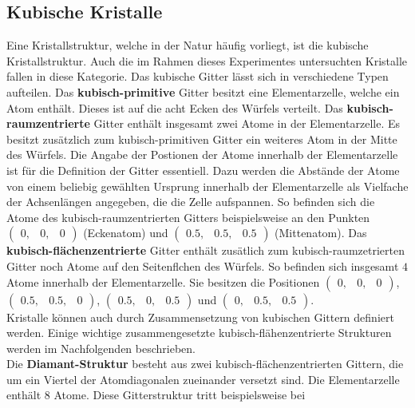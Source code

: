 \subsection{Kubische Kristalle}
%
Eine Kristallstruktur, welche in der Natur häufig vorliegt, ist die kubische Kristallstruktur. Auch die im
Rahmen dieses Experimentes untersuchten Kristalle fallen in diese Kategorie. Das kubische Gitter lässt sich
in verschiedene Typen aufteilen. Das \textbf{kubisch-primitive} Gitter besitzt eine Elementarzelle, welche
ein Atom enthält. Dieses ist auf die acht Ecken des Würfels verteilt. Das \textbf{kubisch-raumzentrierte}
Gitter enthält insgesamt zwei Atome in der Elementarzelle. Es besitzt zusätzlich zum kubisch-primitiven
Gitter ein weiteres Atom in der Mitte des Würfels. Die Angabe der Postionen der Atome innerhalb der
Elementarzelle ist für die Definition der Gitter essentiell. Dazu werden die Abstände der Atome von einem
beliebig gewählten Ursprung innerhalb der Elementarzelle als Vielfache der Achsenlängen angegeben, die die
Zelle aufspannen. So befinden sich die Atome des kubisch-raumzentrierten Gitters beispielsweise an den
Punkten $\begin{pmatrix}0, & 0, & 0 \end{pmatrix}$ (Eckenatom) und $\begin{pmatrix}0.5, & 0.5, & 0.5 \end{pmatrix}$
(Mittenatom). Das \textbf{kubisch-flächenzentrierte} Gitter enthält zusätlich zum kubisch-raumzetrierten Gitter
noch Atome auf den Seitenflchen des Würfels. So befinden sich insgesamt $4$ Atome innerhalb der Elementarzelle.
Sie besitzen die Positionen $\begin{pmatrix}0, & 0, & 0 \end{pmatrix}$, $\begin{pmatrix}0.5, & 0.5, & 0 \end{pmatrix}$,
$\begin{pmatrix}0.5, & 0, & 0.5 \end{pmatrix}$ und $\begin{pmatrix}0, & 0.5, & 0.5 \end{pmatrix}$.\\
Kristalle können auch durch Zusammensetzung von kubischen Gittern definiert werden. Einige wichtige zusammengesetzte
kubisch-flähenzentrierte Strukturen werden im Nachfolgenden beschrieben.\\
Die \textbf{Diamant-Struktur} besteht aus zwei kubisch-flächenzentrierten Gittern, die um ein Viertel der Atomdiagonalen
zueinander versetzt sind. Die Elementarzelle enthält $8$ Atome. Diese Gitterstruktur tritt beispielsweise bei

